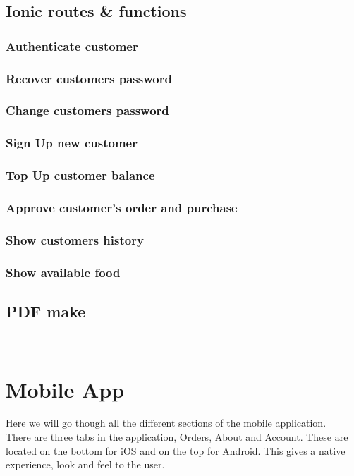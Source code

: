 	\subsection{Ionic routes \& functions}
		\subsubsection{Authenticate customer}
		\subsubsection{Recover customers password}
		\subsubsection{Change customers password}
		\subsubsection{Sign Up new customer}
		\subsubsection{Top Up customer balance}
		\subsubsection{Approve customer's order and purchase}
		\subsubsection{Show customers history}
		\subsubsection{Show available food}
	
	

\subsection{PDF make}

~\cite{PDF_Make_module}

\pagebreak
  \section{Mobile App}
Here we will go though all the different sections of the mobile application.
\\

There are three tabs in the application, Orders, About and Account.
These are located on the bottom for iOS and on the top for Android.
This gives a native experience, look and feel to the user.
\\

